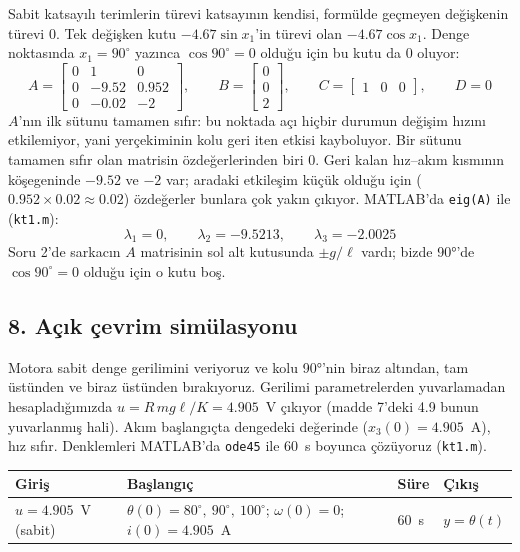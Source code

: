 \documentclass[11pt,a4paper]{article}
\begin{document}
Sabit katsayılı terimlerin türevi katsayının kendisi, formülde geçmeyen değişkenin türevi $0$. Tek değişken kutu $-4.67\sin x_1$'in türevi olan $-4.67\cos x_1$. Denge noktasında $x_1 = 90^\circ$ yazınca $\cos 90^\circ = 0$ olduğu için bu kutu da $0$ oluyor:
\[
A = \begin{bmatrix} 0 & 1 & 0\\ 0 & -9.52 & 0.952\\ 0 & -0.02 & -2\end{bmatrix},
\qquad
B = \begin{bmatrix} 0\\ 0\\ 2\end{bmatrix},
\qquad
C = \begin{bmatrix} 1 & 0 & 0\end{bmatrix},
\qquad
D = 0
\]
$A$'nın ilk sütunu tamamen sıfır: bu noktada açı hiçbir durumun değişim hızını etkilemiyor, yani yerçekiminin kolu geri iten etkisi kayboluyor. Bir sütunu tamamen sıfır olan matrisin özdeğerlerinden biri $0$. Geri kalan hız--akım kısmının köşegeninde $-9.52$ ve $-2$ var; aradaki etkileşim küçük olduğu için ($0.952 \times 0.02 \approx 0.02$) özdeğerler bunlara çok yakın çıkıyor. MATLAB'da \texttt{eig(A)} ile (\texttt{kt1.m}):
\[
\lambda_1 = 0, \qquad \lambda_2 = -9.5213, \qquad \lambda_3 = -2.0025
\]
Soru 2'de sarkacın $A$ matrisinin sol alt kutusunda $\pm g/\ell$ vardı; bizde 90°'de $\cos 90^\circ = 0$ olduğu için o kutu boş.

\subsection*{8. Açık çevrim simülasyonu}

Motora sabit denge gerilimini veriyoruz ve kolu 90°'nin biraz altından, tam üstünden ve biraz üstünden bırakıyoruz. Gerilimi parametrelerden yuvarlamadan hesapladığımızda $u = R\,mg\ell/K = 4.905$~V çıkıyor (madde 7'deki 4.9 bunun yuvarlanmış hali). Akım başlangıçta dengedeki değerinde ($x_3(0) = 4.905$~A), hız sıfır. Denklemleri MATLAB'da \texttt{ode45} ile 60~s boyunca çözüyoruz (\texttt{kt1.m}).

\begin{center}
\begin{tabular}{llll}
\toprule
Giriş & Başlangıç & Süre & Çıkış\\
\midrule
$u = 4.905$~V (sabit) & $\theta(0) = 80^\circ,\ 90^\circ,\ 100^\circ$; $\omega(0)=0$; $i(0) = 4.905$~A & 60~s & $y = \theta(t)$\\
\bottomrule
\end{tabular}
\end{center}
\end{document}
